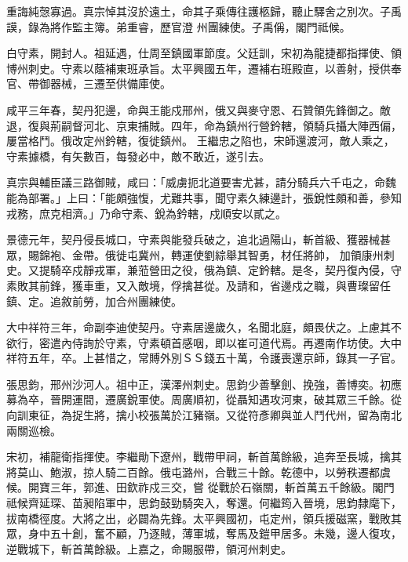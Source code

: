 \begin{pinyinscope}
 重誨純愨寡過。真宗悼其沒於遠土，命其子乘傳往護柩歸，聽止驛舍之別次。子禹謨，錄為將作監主簿。弟重睿，歷官澄
 州團練使。子禹偁，閣門祗候。



 白守素，開封人。祖延遇，仕周至鎮國軍節度。父廷訓，宋初為龍捷都指揮使、領博州刺史。守素以蔭補東班承旨。太平興國五年，遷補右班殿直，以善射，授供奉官、帶御器械，三遷至供備庫使。



 咸平三年春，契丹犯邊，命與王能戍邢州，俄又與麥守恩、石贊領先鋒御之。敵退，復與荊嗣督河北、京東捕賊。四年，命為鎮州行營鈐轄，領騎兵攝大陣西偏，屢當格鬥。俄改定州鈐轄，復徙鎮州。
 王繼忠之陷也，宋師還渡河，敵人乘之，守素據橋，有矢數百，每發必中，敵不敢近，遂引去。



 真宗與輔臣議三路御賊，咸曰：「威虜扼北道要害尤甚，請分騎兵六千屯之，命魏能為部署。」上曰：「能頗強愎，尤難共事，聞守素久練邊計，張銳性頗和善，參知戎務，庶克相濟。」乃命守素、銳為鈐轄，戍順安以貳之。



 景德元年，契丹侵長城口，守素與能發兵破之，追北過陽山，斬首級、獲器械甚眾，賜錦袍、金帶。俄徙屯冀州，轉運使劉綜舉其智勇，材任將帥，
 加領康州刺史。又提騎卒戍靜戎軍，兼蒞營田之役，俄為鎮、定鈐轄。是冬，契丹復內侵，守素敗其前鋒，獲車重，又入敵境，俘擒甚從。及請和，省邊戍之職，與曹璨留任鎮、定。追敘前勞，加合州團練使。



 大中祥符三年，命副李迪使契丹。守素居邊歲久，名聞北庭，頗畏伏之。上慮其不欲行，密遣內侍詢於守素，守素頓首感咽，即以崔可道代焉。再遷南作坊使。大中祥符五年，卒。上甚惜之，常賻外別ＳＳ錢五十萬，令護喪還京師，錄其一子官。



 張思鈞，邢州沙河人。祖中正，漢澤州刺史。思鈞少善擊劍、挽強，善博奕。初應募為卒，晉開運間，遷廣銳軍使。周廣順初，從聶知遇攻河東，破其眾三千餘。從向訓東征，為捉生將，擒小校張萬於江豬嶺。又從符彥卿與並人鬥代州，留為南北兩關巡檢。



 宋初，補龍衛指揮使。李繼勛下遼州，戰帶甲祠，斬首萬餘級，追奔至長城，擒其將莫山、鮑淑，掠人騎二百餘。俄屯潞州，合戰三十餘。乾德中，以勞秩遷都虞候。開寶三年，郭進、田欽祚戍三交，嘗
 從戰於石嶺關，斬首萬五千餘級。閣門祗候齊延琛、苗昶陷軍中，思鈞鼓勁騎突入，奪還。何繼筠入晉境，思鈞隸麾下，拔南橋徑度。大將之出，必闢為先鋒。太平興國初，屯定州，領兵援磁窯，戰敗其眾，身中五十創，奮不顧，乃逐賊，薄軍城，奪馬及鎧甲居多。未幾，邊人復攻，逆戰城下，斬首萬餘級。上嘉之，命賜服帶，領河州刺史。




\end{pinyinscope}
